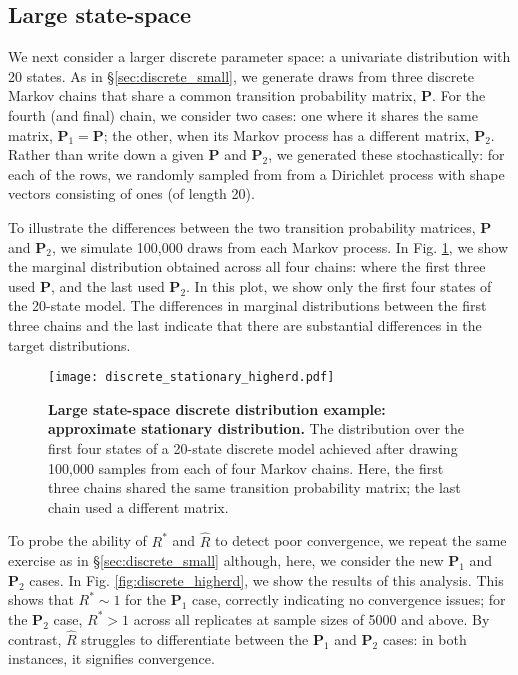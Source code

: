 \documentclass{article}
\begin{document}
\subsection{Large state-space}\label{sec:discrete_large}
We next consider a larger discrete parameter space: a univariate distribution with 20 states. As in \S\ref{sec:discrete_small}, we generate draws from three discrete Markov chains that share a common transition probability matrix, $\boldsymbol{P}$. For the fourth (and final) chain, we consider two cases: one where it shares the same matrix, $\boldsymbol{P}_1=\boldsymbol{P}$; the other, when its Markov process has a different matrix, $\boldsymbol{P}_2$. Rather than write down a given $\boldsymbol{P}$ and $\boldsymbol{P}_2$, we generated these stochastically: for each of the rows, we randomly sampled from from a Dirichlet process with shape vectors consisting of ones (of length 20).

To illustrate the differences between the two transition probability matrices, $\boldsymbol{P}$ and $\boldsymbol{P}_2$, we simulate 100,000 draws from each Markov process. In Fig. \ref{fig:discrete_stationary_higherd}, we show the marginal distribution obtained across all four chains: where the first three used $\boldsymbol{P}$, and the last used $\boldsymbol{P}_2$. In this plot, we show only the first four states of the 20-state model. The differences in marginal distributions between the first three chains and the last indicate that there are substantial differences in the target distributions.

\begin{figure}[!htb]
	\centerline{\texttt{[image: discrete\_stationary\_higherd.pdf]}}
	\caption{\textbf{Large state-space discrete distribution example: approximate stationary distribution.} The distribution over the first four states of a 20-state discrete model achieved after drawing 100,000 samples from each of four Markov chains. Here, the first three chains shared the same transition probability matrix; the last chain used a different matrix.}
	\label{fig:discrete_stationary_higherd}
\end{figure}

To probe the ability of $R^*$ and $\widehat{R}$ to detect poor convergence, we repeat the same exercise as in \S\ref{sec:discrete_small} although, here, we consider the new $\boldsymbol{P}_1$ and $\boldsymbol{P}_2$ cases. In Fig. \ref{fig:discrete_higherd}, we show the results of this analysis. This shows that $R^*\sim 1$ for the $\boldsymbol{P}_1$ case, correctly indicating no convergence issues; for the $\boldsymbol{P}_2$ case, $R^*>1$ across all replicates at sample sizes of 5000 and above. By contrast, $\widehat{R}$ struggles to differentiate between the $\boldsymbol{P}_1$ and $\boldsymbol{P}_2$ cases: in both instances, it signifies convergence.
\end{document}
